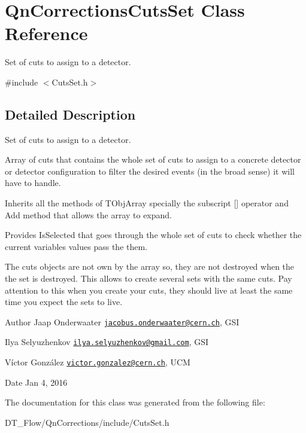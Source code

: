 \hypertarget{classQnCorrectionsCutsSet}{}\section{Qn\+Corrections\+Cuts\+Set Class Reference}
\label{classQnCorrectionsCutsSet}


Set of cuts to assign to a detector.  




{\ttfamily \#include $<$Cuts\+Set.\+h$>$}



\subsection{Detailed Description}
Set of cuts to assign to a detector. 

Array of cuts that contains the whole set of cuts to assign to a concrete detector or detector configuration to filter the desired events (in the broad sense) it will have to handle.

Inherits all the methods of T\+Obj\+Array specially the subscript \mbox{[}\mbox{]} operator and Add method that allows the array to expand.

Provides Is\+Selected that goes through the whole set of cuts to check whether the current variables values pass the them.

The cuts objects are not own by the array so, they are not destroyed when the the set is destroyed. This allows to create several sets with the same cuts. Pay attention to this when you create your cuts, they should live at least the same time you expect the sets to live.

\begin{DoxyAuthor}{Author}
Jaap Onderwaater \href{mailto:jacobus.onderwaater@cern.ch}{\tt jacobus.\+onderwaater@cern.\+ch}, G\+SI 

Ilya Selyuzhenkov \href{mailto:ilya.selyuzhenkov@gmail.com}{\tt ilya.\+selyuzhenkov@gmail.\+com}, G\+SI 

Víctor González \href{mailto:victor.gonzalez@cern.ch}{\tt victor.\+gonzalez@cern.\+ch}, U\+CM 
\end{DoxyAuthor}
\begin{DoxyDate}{Date}
Jan 4, 2016 
\end{DoxyDate}


The documentation for this class was generated from the following file\+:\begin{DoxyCompactItemize}
\item 
D\+T\+\_\+\+Flow/\+Qn\+Corrections/include/Cuts\+Set.\+h\end{DoxyCompactItemize}
